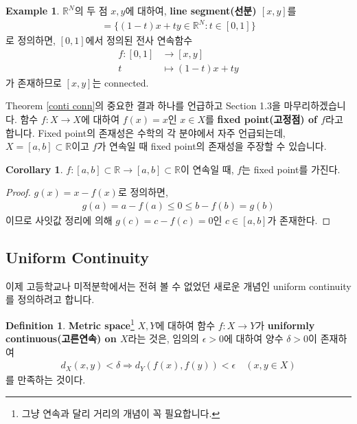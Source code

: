 \documentclass[12pt]{article}
\theoremstyle{definition}
\newtheorem{cor}[thm]{Corollary}
\newtheorem{defn}[thm]{Definition}
\newtheorem*{ex}{Example}
\def\RR{\mathbb{R}}
\def\eps{\epsilon}
\begin{document}
\begin{ex}
	\(\RR^N\)의 두 점 \(x, y\)에 대하여, \textbf{line segment(선분) \([x, y]\)}를
	\begin{gather*}
		[x, y] = \{(1-t)x + ty \in \RR^N: t \in [0, 1]\}
	\end{gather*}
	로 정의하면, \([0, 1]\)에서 정의된 전사 연속함수
	\begin{align*}
		f: [0, 1] &\rightarrow [x, y]\\
		t &\mapsto (1-t)x + ty
	\end{align*}
	가 존재하므로 \([x, y]\)는 connected.
\end{ex}

Theorem \ref{conti conn}의 중요한 결과 하나를 언급하고 Section 1.3을 마무리하겠습니다. 함수 \(f: X \rightarrow X\)에 대하여 \(f(x) = x\)인 \(x \in X\)를 \textbf{fixed point(고정점) of \(f\)}라고 합니다. Fixed point의 존재성은 수학의 각 분야에서 자주 언급되는데, \(X=[a, b] \subset \RR\)이고 \(f\)가 연속일 때 fixed point의 존재성을 주장할 수 있습니다.

\begin{cor}
	\(f:[a, b] \subset \RR \rightarrow [a, b] \subset \RR\)이 연속일 때, \(f\)는 fixed point를 가진다.
\end{cor}
\begin{proof}
	\(g(x) = x - f(x)\)로 정의하면,
	\begin{gather*}
		g(a) = a - f(a) \le 0 \le b - f(b) = g(b)
	\end{gather*}
	이므로 사잇값 정리에 의해 \(g(c) = c - f(c) = 0\)인 \(c \in [a, b]\)가 존재한다.
\end{proof}

\subsection{Uniform Continuity}

이제 고등학교나 미적분학에서는 전혀 볼 수 없었던 새로운 개념인 uniform continuity를 정의하려고 합니다.

\begin{defn}
	\textbf{Metric space}\footnote{그냥 연속과 달리 거리의 개념이 꼭 필요합니다.} \(X, Y\)에 대하여 함수 \(f: X \rightarrow Y\)가 \textbf{uniformly continuous(고른연속) on \(X\)}라는 것은, 임의의 \(\eps > 0\)에 대하여 양수 \(\delta > 0\)이 존재하여\\
	\begin{gather} \label{uniconti}
		d_X(x, y) < \delta \Longrightarrow d_Y (f(x), f(y)) < \eps \quad (x, y \in X)
	\end{gather}
	를 만족하는 것이다.
\end{defn}
\end{document}
